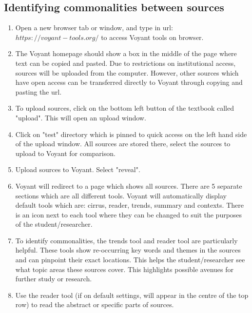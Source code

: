 \documentclass{article}
\begin{document}
\subsection{Identifying commonalities between sources}
\begin{enumerate}
    \item Open a new browser tab or window, and type in url: $https://voyant-tools.org/$ to access Voyant tools on browser.
    \item The Voyant homepage should show a box in the middle of the page where text can be copied and pasted. Due to restrictions on institutional access, sources will be uploaded from the computer. However, other sources which have open access can be transferred directly to Voyant through copying and pasting the url.
    \item To upload sources, click on the bottom left button of the textbook called "upload". This will open an upload window.
    \item Click on "test" directory which is pinned to quick access on the left hand side of the upload window. All sources are stored there, select the sources to upload to Voyant for comparison.
    \item Upload sources to Voyant. Select "reveal".
    \item Voyant will redirect to a page which shows all sources. There are 5 separate sections which are all different tools. Voyant will automatically display default tools which are: cirrus, reader, trends, summary and contexts. There is an icon next to each tool where they can be changed to suit the purposes of the student/researcher.
    \item To identify commonalities, the trends tool and reader tool are particularly helpful. These tools show re-occurring key words and themes in the sources and can pinpoint their exact locations. This helps the student/researcher see what topic areas these sources cover. This highlights possible avenues for further study or research.
    \item Use the reader tool (if on default settings, will appear in the centre of the top row) to read the abstract or specific parts of sources.
\end{enumerate}
\end{document}
